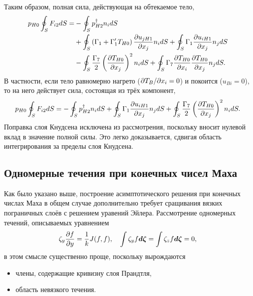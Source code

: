 Таким образом, полная сила, действующая на обтекаемое тело,
\begin{align}\label{eq:kgf:force_general}
    p_{H0} \oint_S F_{i2} \dd{S} =
        &- \oint_S p_{H2}^\dag n_i \dd{S} \notag\\
        &+ \oint_S \left( \Gamma_1 + \Gamma_1'T_{H0} \right) \pder[u_{jH1}]{x_j} n_i \dd{S}
        +  \oint_S \Gamma_1 \pder[u_{iH1}]{x_j} n_j \dd{S} \notag\\
        &- \oint_S \frac{\Gamma_7}2\left(\pder[T_{H0}]{x_j}\right)^2 n_i \dd{S}
        +  \oint_S \Gamma_7\pder[T_{H0}]{x_i}\pder[T_{H0}]{x_j} n_j \dd{S}.
\end{align}
В частности, если тело равномерно нагрето (\(\Pder[T_B]{x_i}=0\)) и покоится (\(u_{Bi}=0\)),
то на него действует сила, состоящая из трёх компонент,
\begin{equation}\label{eq:kgf:force}
    p_{H0} \oint_S F_{i2} \dd{S} =
        - \oint_S p_{H2}^\dag n_i \dd{S} \\
        + \oint_S \Gamma_1\pder[u_{iH1}]{x_j} n_j \dd{S}
        + \oint_S \frac{\Gamma_7}2\left(\pder[T_{H0}]{x_j}\right)^2 n_i \dd{S}.
\end{equation}
Поправка слоя Кнудсена исключена из рассмотрения, поскольку вносит нулевой вклад в значение полной силы.
Это легко доказывается, сдвигая область интегрирования за пределы слоя Кнудсена.

\subsection{Одномерные течения при конечных чисел Маха}

Как было указано выше, построение асимптотического решения при конечных числах Маха в общем случае
дополнительно требует сращивания вязких пограничных слоёв с решением уравений Эйлера.
Рассмотрение одномерных течений, описываемых уравнением
\begin{equation}\label{eq:1d}
    \zeta_y\pder[f]{y} = \frac1kJ(f,f), \quad \int\zeta_yf\dzeta = \int\zeta_zf\dzeta = 0,
\end{equation}
в этом смысле существенно проще, поскольку вырождаются
\begin{itemize}
    \item члены, содержащие кривизну слоя Прандтля,
    \item область невязкого течения.
\end{itemize}

